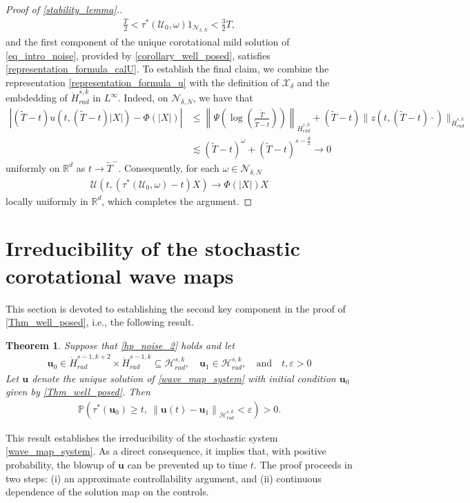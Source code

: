 \documentclass[12pt,reqno]{amsart}
\theoremstyle{plain}
\newtheorem{theorem}{Theorem}[section]
\theoremstyle{remark}
\theoremstyle{plain}
\theoremstyle{definition}
\numberwithin{equation}{section}
\numberwithin{equation}{section}
\newcommand{\norm}[1]{\left\|#1\right\|}
\newcommand{\HH}{\mathcal{H}}
\newcommand{\eps}{\varepsilon}
\begin{document}
\begin{proof}[Proof of \autoref{stability_lemma}.]
\begin{align*}
		    \frac{T}{2}<\tau^*(\boldsymbol{\mathcal{U}}_0,\omega)1_{\mathcal{N}_{\delta,N}}<\frac{3}{2}T,
		\end{align*} 
        and the first component of the unique corotational mild solution of \eqref{eq_intro_noise}, provided by \autoref{corollary_well_posed}, satisfies \eqref{representation_formula_calU}. To establish the final claim, we combine the representation \eqref{representation_formula_u} with the definition of $\mathcal{X}_{\delta}$ and the embdedding of $\dot{H}^{s,k}_{rad}$ in $L^{\infty}$. Indeed, on $\mathcal{N}_{\delta,N}$, we have that
		\begin{align*}
			\left\lvert (\tilde{T}-t)u(t,(\tilde{T}-t)\lvert X\rvert)-\Phi\left(\lvert X\rvert\right)\right\rvert & \leq \left\lVert  \Psi\left(\log\left(\frac{\tilde{T}}{\tilde{T}-t}\right)\right)\right\rVert_{\dot{H}^{s,k}_{rad}}+ (\tilde{T}-t)\lVert z(t,(\tilde{T}-t)\cdot)\rVert_{\dot{H}^{s,k}_{rad}} \\ & \lesssim   (\tilde{T}-t)^{\overline{\omega}}+(\tilde{T}-t)^{s-\frac{d}{2}}\rightarrow 0
		\end{align*}
        uniformly on $\mathbb{R}^d$
		as $t\rightarrow\tilde{T}^-.$ Consequently, for each $\omega\in \mathcal{N}_{\delta,N}$
		\begin{align*}
			\mathcal{U}(t,(\tau^{*}(\boldsymbol{\mathcal{U}}_0,\omega)-t)X)\rightarrow \Phi(\lvert X\rvert)X
		\end{align*}
		locally uniformly in $\mathbb{R}^d$, which completes the argument.
	\end{proof}
	\section{Irreducibility of the stochastic corotational wave maps}\label{Section_Irreducibility}
	\noindent This section is devoted to establishing the second key component in the proof of \autoref{Thm_well_posed}, i.e., the following result.
	\begin{theorem}\label{Thm_irreducibility}
		Suppose that \autoref{hp_noise_2} holds and let \begin{align*}
		    \mathbf{u}_0\in \dot{H}^{s-1,k+2}_{rad}\times \dot{H}^{s-1,k}_{rad}\subseteq \HH_{rad}^{s,k} ,\quad  \mathbf{u}_1\in \HH_{rad}^{s,k},\quad \text{and} \quad t,\eps>0
		\end{align*} Let $\mathbf{u}$ denote the unique solution of \eqref{wave_map_system} with initial condition $\mathbf{u}_0$ given by \autoref{Thm_well_posed}. Then
		\begin{align*}
			\mathbb{P}(\tau^*(\mathbf{u}_0)\geq t,~ \norm{\mathbf{u}(t)-\mathbf{u}_1}_{\HH_{rad}^{s,k}}<\eps)>0.
		\end{align*}
	\end{theorem}
	\noindent This result establishes the irreducibility of the stochastic system \eqref{wave_map_system}. As a direct consequence, it implies that, with positive probability, the blowup of $\mathbf{u}$ can be prevented up to time $t$. The proof proceeds in two steps: (i) an approximate controllability argument, and (ii) continuous dependence of the solution map on the controls.
\end{document}
